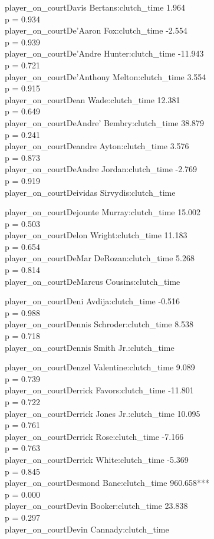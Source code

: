 \documentclass[
  landscape]{article}
\begin{document}
player\_on\_courtDavis Bertans:clutch\_time 1.964\\
p = 0.934\\
player\_on\_courtDe'Aaron Fox:clutch\_time -2.554\\
p = 0.939\\
player\_on\_courtDe'Andre Hunter:clutch\_time -11.943\\
p = 0.721\\
player\_on\_courtDe'Anthony Melton:clutch\_time 3.554\\
p = 0.915\\
player\_on\_courtDean Wade:clutch\_time 12.381\\
p = 0.649\\
player\_on\_courtDeAndre' Bembry:clutch\_time 38.879\\
p = 0.241\\
player\_on\_courtDeandre Ayton:clutch\_time 3.576\\
p = 0.873\\
player\_on\_courtDeAndre Jordan:clutch\_time -2.769\\
p = 0.919\\
player\_on\_courtDeividas Sirvydis:clutch\_time

player\_on\_courtDejounte Murray:clutch\_time 15.002\\
p = 0.503\\
player\_on\_courtDelon Wright:clutch\_time 11.183\\
p = 0.654\\
player\_on\_courtDeMar DeRozan:clutch\_time 5.268\\
p = 0.814\\
player\_on\_courtDeMarcus Cousins:clutch\_time

player\_on\_courtDeni Avdija:clutch\_time -0.516\\
p = 0.988\\
player\_on\_courtDennis Schroder:clutch\_time 8.538\\
p = 0.718\\
player\_on\_courtDennis Smith Jr.:clutch\_time

player\_on\_courtDenzel Valentine:clutch\_time 9.089\\
p = 0.739\\
player\_on\_courtDerrick Favors:clutch\_time -11.801\\
p = 0.722\\
player\_on\_courtDerrick Jones Jr.:clutch\_time 10.095\\
p = 0.761\\
player\_on\_courtDerrick Rose:clutch\_time -7.166\\
p = 0.763\\
player\_on\_courtDerrick White:clutch\_time -5.369\\
p = 0.845\\
player\_on\_courtDesmond Bane:clutch\_time 960.658***\\
p = 0.000\\
player\_on\_courtDevin Booker:clutch\_time 23.838\\
p = 0.297\\
player\_on\_courtDevin Cannady:clutch\_time
\end{document}
